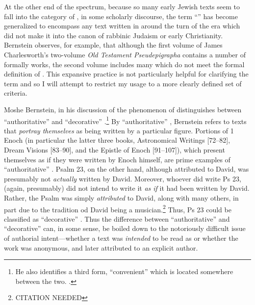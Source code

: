 At the other end of the spectrum, because so many early Jewish texts seem to fall into the category of \psa, in some scholarly discourse, the term ``\psa'' has become generalized to encompass any text written in around the turn of the era which did not make it into the canon of rabbinic Judaism or early Christianity. Bernstein observes, for example, that although the first volume of James Charlesworth's two-volume \emph{Old Testament Pseudepigrapha} contains a number of formally \psgraphic works, the second volume includes many which do not meet the formal definition of \psa.\autocites[2]{bernstein_chazon-etal1999}{charlesworth_OTP} This expansive practice is not particularly helpful for clarifying the term and so I will attempt to restrict my usage to a more clearly defined set of criteria.

Moshe Bernstein, in his discussion of the phenomenon of \psy distinguishes between ``authoritative'' \psy and ``decorative'' \psy.\footnote{He also identifies a third form, ``convenient'' \psy which is located somewhere between the two. \cite[3--7]{bernstein_chazon-etal1999}.} By ``authoritative'' \psy, Bernstein refers to texts that \emph{portray themselves} as being written by a particular figure. Portions of 1 Enoch (in particular the latter three books, Astronomical Writings [72--82], Dream Visions [83--90], and the Epistle of Enoch [91--107]), which present themselves as if they were written by Enoch himself, are prime examples of ``authoritative'' \psy. Psalm 23, on the other hand, although attributed to David, was presumably not \emph{actually} written by David. Moreover, whoever did write Ps 23, (again, presumably) did not intend to write it \emph{as if} it had been written by David. Rather, the Psalm was simply \emph{attributed} to David, along with many others, in part due to the tradition od David being a musician.\footnote{CITATION NEEDED} Thus, Ps 23 could be classified as ``decorative'' \psy. Thus the difference between ``authoritative'' and ``decorative'' \psy can, in some sense, be boiled down to the notoriously difficult issue of authorial intent---whether a text was \emph{intended} to be read as \psa or whether the work was anonymous, and later attributed to an explicit author.

